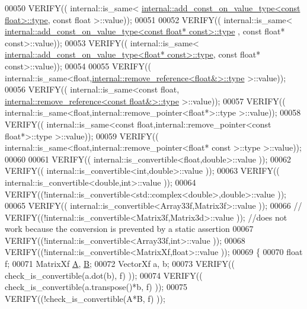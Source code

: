 \begin{DoxyCode}
00050   VERIFY(( internal::is\_same< 
      \hyperlink{group___sparse_core___module}{internal::add\_const\_on\_value\_type<const float>::type}, \textcolor{keyword}{
      const} \textcolor{keywordtype}{float} >::value));
00051 
00052   VERIFY(( internal::is\_same< 
      \hyperlink{group___sparse_core___module}{internal::add\_const\_on\_value\_type<const float* const>::type}
      , \textcolor{keyword}{const} \textcolor{keywordtype}{float}* \textcolor{keyword}{const}>::value));
00053   VERIFY(( internal::is\_same< 
      \hyperlink{group___sparse_core___module}{internal::add\_const\_on\_value\_type<float* const>::type},
       \textcolor{keyword}{const} \textcolor{keywordtype}{float}* \textcolor{keyword}{const}>::value));
00054   
00055   VERIFY(( internal::is\_same<\textcolor{keywordtype}{float},\hyperlink{group___sparse_core___module}{internal::remove\_reference<float&>::type}
       >::value));
00056   VERIFY(( internal::is\_same<\textcolor{keyword}{const} \textcolor{keywordtype}{float},
      \hyperlink{group___sparse_core___module}{internal::remove\_reference<const float&>::type} >::value));
00057   VERIFY(( internal::is\_same<\textcolor{keywordtype}{float},internal::remove\_pointer<float*>::type >::value));
00058   VERIFY(( internal::is\_same<\textcolor{keyword}{const} \textcolor{keywordtype}{float},internal::remove\_pointer<const float*>::type >::value));
00059   VERIFY(( internal::is\_same<\textcolor{keywordtype}{float},internal::remove\_pointer<float* const >::type >::value));
00060   
00061   VERIFY(( internal::is\_convertible<float,double>::value ));
00062   VERIFY(( internal::is\_convertible<int,double>::value ));
00063   VERIFY(( internal::is\_convertible<double,int>::value ));
00064   VERIFY((!internal::is\_convertible<std::complex<double>,\textcolor{keywordtype}{double}>::value ));
00065   VERIFY(( internal::is\_convertible<Array33f,Matrix3f>::value ));
00066 \textcolor{comment}{//   VERIFY((!internal::is\_convertible<Matrix3f,Matrix3d>::value )); //does not work because the conversion
       is prevented by a static assertion}
00067   VERIFY((!internal::is\_convertible<Array33f,int>::value ));
00068   VERIFY((!internal::is\_convertible<MatrixXf,float>::value ));
00069   \{
00070     \textcolor{keywordtype}{float} f;
00071     MatrixXf \hyperlink{group___core___module_class_eigen_1_1_matrix}{A}, \hyperlink{group___core___module_class_eigen_1_1_matrix}{B};
00072     VectorXf a, b;
00073     VERIFY(( check\_is\_convertible(a.dot(b), f) ));
00074     VERIFY(( check\_is\_convertible(a.transpose()*b, f) ));
00075     VERIFY((!check\_is\_convertible(A*B, f) ));

\end{DoxyCode}
